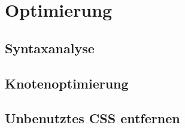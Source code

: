 \section{Optimierung}

\subsection{Syntaxanalyse}
\subsection{Knotenoptimierung}

\subsection{Unbenutztes CSS entfernen}
\label{unused_css_delete}